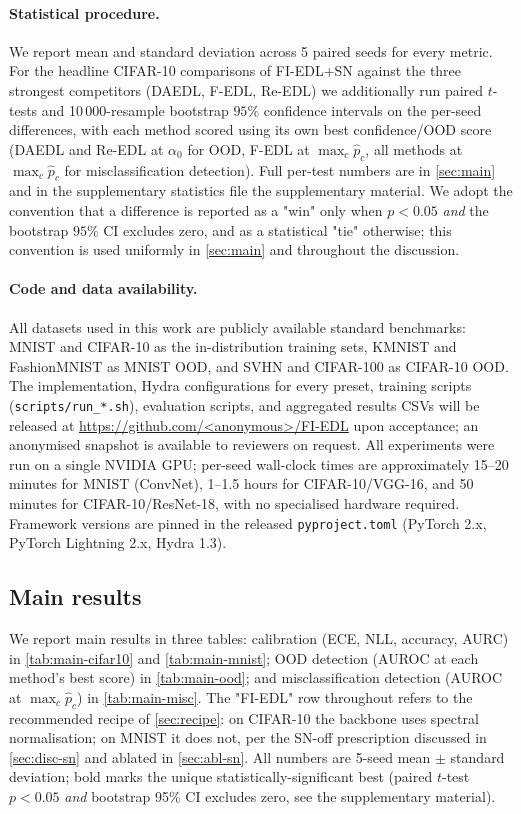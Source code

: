 \documentclass[review,5p,times]{elsarticle}
\begin{document}
\paragraph{Statistical procedure.}
We report mean and standard deviation across 5 paired seeds for every
metric. For the headline CIFAR-10 comparisons of FI-EDL+SN against the three
strongest competitors (DAEDL, F-EDL, Re-EDL) we additionally run paired
$t$-tests and 10\,000-resample bootstrap $95\%$ confidence intervals on the
per-seed differences, with each method scored using its own best
confidence/OOD score (DAEDL and Re-EDL at $\alpha_0$ for OOD, F-EDL at
$\max_c\hat p_c$, all methods at $\max_c\hat p_c$ for misclassification
detection). Full per-test numbers are in \autoref{sec:main} and in the
supplementary statistics file the supplementary material.
We adopt the convention that a difference is reported as a "win" only when
$p\!<\!0.05$ \emph{and} the bootstrap $95\%$ CI excludes zero, and as a
statistical "tie" otherwise; this convention is used uniformly in
\autoref{sec:main} and throughout the discussion.

\paragraph{Code and data availability.}
All datasets used in this work are publicly available standard
benchmarks: MNIST and CIFAR-10 as the in-distribution training sets,
KMNIST and FashionMNIST as MNIST OOD, and SVHN and CIFAR-100 as CIFAR-10
OOD. The implementation, Hydra configurations for every preset, training
scripts (\texttt{scripts/run\_*.sh}), evaluation scripts, and aggregated
results CSVs will be released at
\url{https://github.com/<anonymous>/FI-EDL} upon acceptance; an
anonymised snapshot is available to reviewers on request. All
experiments were run on a single NVIDIA GPU; per-seed wall-clock times
are approximately 15--20 minutes for MNIST (ConvNet), 1--1.5 hours for
CIFAR-10/VGG-16, and 50 minutes for CIFAR-10/ResNet-18, with no
specialised hardware required. Framework versions are pinned in the
released \texttt{pyproject.toml} (PyTorch 2.x, PyTorch Lightning 2.x,
Hydra 1.3).

\subsection{Main results}\label{sec:main}

We report main results in three tables: calibration (ECE, NLL,
accuracy, AURC) in \autoref{tab:main-cifar10} and \autoref{tab:main-mnist};
OOD detection (AUROC at each method's best score) in
\autoref{tab:main-ood}; and misclassification detection (AUROC at
$\max_c\hat p_c$) in \autoref{tab:main-misc}. The "FI-EDL" row throughout
refers to the recommended recipe of \autoref{sec:recipe}: on CIFAR-10 the
backbone uses spectral normalisation; on MNIST it does not, per the
SN-off prescription discussed in \autoref{sec:disc-sn} and ablated in
\autoref{sec:abl-sn}. All numbers are 5-seed mean $\pm$ standard
deviation; bold marks the unique statistically-significant best (paired
$t$-test $p\!<\!0.05$ \emph{and} bootstrap 95\% CI excludes zero, see
the supplementary material).
\end{document}
